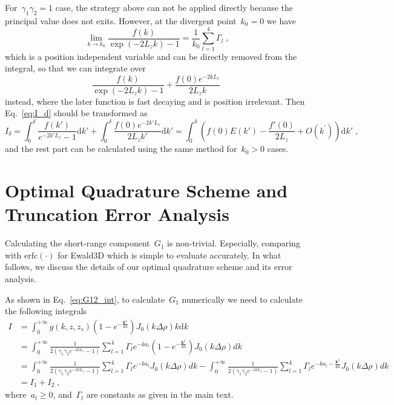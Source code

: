 \documentclass[aps,prl,reprint,showpacs,floatfix,superscriptaddress, onecolumn]{revtex4-2}
\newcommand{\V}[1]{\boldsymbol{#1}} %
\begin{document}
For~$\gamma_1 \gamma_2 = 1$ case, the strategy above can not be applied directly because the principal value does not exits.
However, at the divergent point~$k_0 = 0$ we have
\begin{equation}
    \lim_{k \to k_0}  \frac{f(k)}{\exp{\left(-2 L_z k \right)} - 1} = \frac{1}{k_0} \sum_{l = 1}^4 \Gamma_l \;,
\end{equation}
which is a position independent variable and can be directly removed from the integral, so that we can integrate over
\begin{equation}
     \frac{f(k)}{\exp{\left(-2 L_z k \right)} - 1} + \frac{f(0) e^{-2 k L_z}}{2 L_z k}\;
\end{equation}
instead, where the later function is fast decaying and is position irrelevant.
Then Eq.~\eqref{eq:I_d} should be transformed as
\begin{equation}
    I_{\delta} = \int_{0}^{\delta} \frac{f(k')}{e^{-2k' L_z} - 1} \text{d} k' + \int_{0}^{\delta} \frac{f(0) e^{-2 k' L_z}}{2 L_z k'} \text{d} k' = \int_{0}^{\delta} \left( f(0) E(k')  - \frac{f'(0)}{2 L_z} + O(k^{\prime})\right) \text{d} k'\;,
\end{equation}
and the rest part can be calculated using the same method for~$k_0 > 0$ cases.


\section{Optimal Quadrature Scheme and Truncation Error Analysis}
Calculating the short-range component~$G_1$ is non-trivial. Especially, comparing with $\mathrm{erfc}(\cdot)$ for Ewald3D which is simple to evaluate accurately. In what follows, we discuss the details of our optimal quadrature scheme and its error analysis.

As shown in Eq.~\eqref{eq:G12_int}, to calculate~$G_1$ numerically we need to calculate the following integrals
\begin{equation}\label{eq:G_1_int}
\begin{split}
    I &= \int_{0}^{+\infty} g(k, z, z_s) \left( 1-e^{-\frac{\V{k}^2}{4 \alpha}} \right) J_0(k \Delta \rho) k \text{d} k\;\\
    & = \int_{0}^{+\infty} \frac{1}{2 (\gamma_1 \gamma_2 e^{-2k L_z} - 1)} \sum_{l = 1}^{4} \Gamma_l e^{-k a_l} \left( 1-e^{-\frac{\V{k}^2}{4 \alpha}} \right) J_0(k \Delta \rho) d k\;\\
    & = \int_{0}^{+\infty} \frac{1}{2 (\gamma_1 \gamma_2 e^{-2k L_z} - 1)} \sum_{l = 1}^{4} \Gamma_l e^{-k a_l} J_0(k \Delta \rho) d k - \int_{0}^{+\infty} \frac{1}{2 (\gamma_1 \gamma_2 e^{-2k L_z} - 1)} \sum_{l = 1}^{4} \Gamma_l e^{-k a_l -\frac{\V{k}^2}{4 \alpha}} J_0(k \Delta \rho) d k \;\\
    & = I_1 + I_2\;,
\end{split}
\end{equation}
where~$a_l \ge 0$, and~$\Gamma_l$ are constants as given in the main text.
\end{document}
